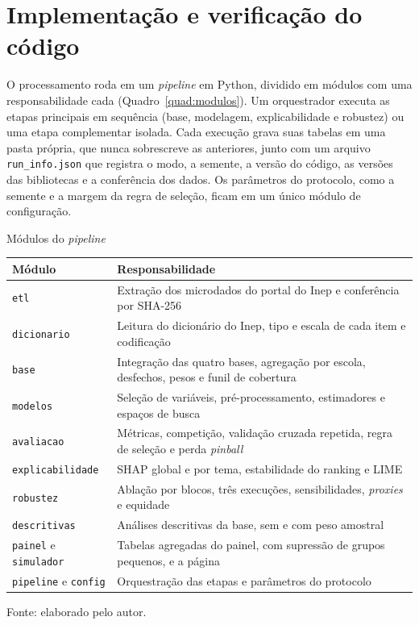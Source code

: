 \section{Implementação e verificação do código}
\label{sec:implementacao}

O processamento roda em um \textit{pipeline} em Python, dividido em módulos
com uma responsabilidade cada (Quadro~\ref{quad:modulos}). Um orquestrador
executa as etapas principais em sequência (base, modelagem, explicabilidade
e robustez) ou uma etapa complementar isolada. Cada execução grava suas
tabelas em uma pasta própria, que nunca sobrescreve as anteriores, junto com
um arquivo \texttt{run\_info.json} que registra o modo, a semente, a versão
do código, as versões das bibliotecas e a conferência dos dados. Os
parâmetros do protocolo, como a semente e a margem da regra de seleção,
ficam em um único módulo de configuração.

\begin{quadro}[H]
    \centering
    \footnotesize
    \caption{Módulos do \textit{pipeline}}
    \begin{tabular}{|L{3.4cm}|L{10.8cm}|}
        \hline
        \textbf{Módulo} & \textbf{Responsabilidade} \\
        \hline
        \texttt{etl} & Extração dos microdados do portal do Inep e conferência por SHA-256 \\ \hline
        \texttt{dicionario} & Leitura do dicionário do Inep, tipo e escala de cada item e codificação \\ \hline
        \texttt{base} & Integração das quatro bases, agregação por escola, desfechos, pesos e funil de cobertura \\ \hline
        \texttt{modelos} & Seleção de variáveis, pré-processamento, estimadores e espaços de busca \\ \hline
        \texttt{avaliacao} & Métricas, competição, validação cruzada repetida, regra de seleção e perda \textit{pinball} \\ \hline
        \texttt{explicabilidade} & SHAP global e por tema, estabilidade do ranking e LIME \\ \hline
        \texttt{robustez} & Ablação por blocos, três execuções, sensibilidades, \textit{proxies} e equidade \\ \hline
        \texttt{descritivas} & Análises descritivas da base, sem e com peso amostral \\ \hline
        \texttt{painel} e \texttt{simulador} & Tabelas agregadas do painel, com supressão de grupos pequenos, e a página \\ \hline
        \texttt{pipeline} e \texttt{config} & Orquestração das etapas e parâmetros do protocolo \\
        \hline
    \end{tabular}
    \vspace{0.1cm}
    \begin{flushleft}
    {\footnotesize Fonte: elaborado pelo autor.}
    \end{flushleft}
    \label{quad:modulos}
\end{quadro}

